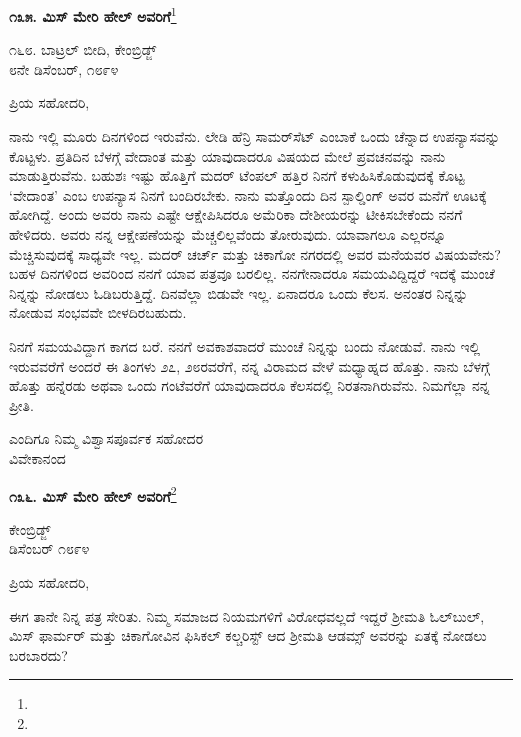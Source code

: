\begin{center}
\textbf{೧೩೫. ಮಿಸ್ ಮೇರಿ ಹೇಲ್ ಅವರಿಗೆ}\footnote{}
\end{center}

\begin{flushright}
೧೬೮. ಬಾಟ್ರಲ್ ಬೀದಿ, ಕೇಂಬ್ರಿಡ್ಜ್\\೮ನೇ ಡಿಸೆಂಬರ್, ೧೮೯೪
\end{flushright}

\noindent
ಪ್ರಿಯ ಸಹೋದರಿ,

ನಾನು ಇಲ್ಲಿ ಮೂರು ದಿನಗಳಿಂದ ಇರುವೆನು. ಲೇಡಿ ಹೆನ್ರಿ ಸಾಮರ್‌ಸೆಟ್\enginline{-} ಎಂಬಾಕೆ ಒಂದು ಚೆನ್ನಾದ ಉಪನ್ಯಾಸವನ್ನು ಕೊಟ್ಟಳು. ಪ್ರತಿದಿನ ಬೆಳಗ್ಗೆ ವೇದಾಂತ ಮತ್ತು ಯಾವುದಾದರೂ ವಿಷಯದ ಮೇಲೆ ಪ್ರವಚನವನ್ನು ನಾನು ಮಾಡುತ್ತಿರುವೆನು. ಬಹುಶಃ ಇಷ್ಟು ಹೊತ್ತಿಗೆ ಮದರ್ ಟೆಂಪಲ್ ಹತ್ತಿರ ನಿನಗೆ ಕಳುಹಿಸಿಕೊಡುವುದಕ್ಕೆ ಕೊಟ್ಟ `ವೇದಾಂತ' ಎಂಬ ಉಪನ್ಯಾಸ ನಿನಗೆ ಬಂದಿರಬೇಕು. ನಾನು ಮತ್ತೊಂದು ದಿನ ಸ್ಪಾಲ್ಡಿಂಗ್ ಅವರ ಮನೆಗೆ ಊಟಕ್ಕೆ ಹೋಗಿದ್ದೆ. ಅಂದು ಅವರು ನಾನು ಎಷ್ಟೇ ಆಕ್ಷೇಪಿಸಿದರೂ ಅಮೆರಿಕಾ ದೇಶೀಯರನ್ನು ಟೀಕಿಸಬೇಕೆಂದು ನನಗೆ ಹೇಳಿದರು. ಅವರು ನನ್ನ ಆಕ್ಷೇಪಣೆಯನ್ನು ಮೆಚ್ಚಲಿಲ್ಲವೆಂದು ತೋರುವುದು. ಯಾವಾಗಲೂ ಎಲ್ಲರನ್ನೂ ಮೆಚ್ಚಿಸುವುದಕ್ಕೆ ಸಾಧ್ಯವೇ ಇಲ್ಲ. ಮದರ್ ಚರ್ಚ್ ಮತ್ತು ಚಿಕಾಗೋ ನಗರದಲ್ಲಿ ಅವರ ಮನೆಯವರ ವಿಷಯವೇನು? ಬಹಳ ದಿನಗಳಿಂದ ಅವರಿಂದ ನನಗೆ ಯಾವ ಪತ್ರವೂ ಬರಲಿಲ್ಲ. ನನಗೇನಾದರೂ ಸಮಯವಿದ್ದಿದ್ದರೆ ಇದಕ್ಕೆ ಮುಂಚೆ ನಿನ್ನನ್ನು ನೋಡಲು ಓಡಿಬರುತ್ತಿದ್ದೆ. ದಿನವೆಲ್ಲಾ ಬಿಡುವೇ ಇಲ್ಲ. ಏನಾದರೂ ಒಂದು ಕೆಲಸ. ಅನಂತರ ನಿನ್ನನ್ನು ನೋಡುವ ಸಂಭವವೇ ಬೀಳದಿರಬಹುದು.

ನಿನಗೆ ಸಮಯವಿದ್ದಾಗ ಕಾಗದ ಬರೆ. ನನಗೆ ಅವಕಾಶವಾದರೆ ಮುಂಚೆ ನಿನ್ನನ್ನು ಬಂದು ನೋಡುವೆ. ನಾನು ಇಲ್ಲಿ ಇರುವವರೆಗೆ ಅಂದರೆ ಈ ತಿಂಗಳು ೨೭, ೨೮ರವರೆಗೆ, ನನ್ನ ವಿರಾಮದ ವೇಳೆ ಮಧ್ಯಾಹ್ನದ ಹೊತ್ತು. ನಾನು ಬೆಳಗ್ಗೆ ಹೊತ್ತು ಹನ್ನೆರಡು ಅಥವಾ ಒಂದು ಗಂಟೆವರೆಗೆ ಯಾವುದಾದರೂ ಕೆಲಸದಲ್ಲಿ ನಿರತನಾಗಿರುವೆನು. ನಿಮಗೆಲ್ಲಾ ನನ್ನ ಪ್ರೀತಿ.

{\flushright
ಎಂದಿಗೂ ನಿಮ್ಮ ವಿಶ್ವಾಸಪೂರ್ವಕ ಸಹೋದರ\\ವಿವೇಕಾನಂದ\par}

\begin{center}
\textbf{೧೩೬. ಮಿಸ್ ಮೇರಿ ಹೇಲ್‌ ಅವರಿಗೆ}\footnote{}
\end{center}

\vspace{-0.7cm}

\begin{flushright}
ಕೇಂಬ್ರಿಡ್ಜ್\\ಡಿಸೆಂಬರ್ ೧೮೯೪
\end{flushright}

\vspace{-0.6cm}

\noindent
ಪ್ರಿಯ ಸಹೋದರಿ,

ಈಗ ತಾನೇ ನಿನ್ನ ಪತ್ರ ಸೇರಿತು. ನಿಮ್ಮ ಸಮಾಜದ ನಿಯಮಗಳಿಗೆ ವಿರೋಧವಲ್ಲದೆ ಇದ್ದರೆ ಶ‍್ರೀಮತಿ ಓಲ್‌ಬುಲ್, ಮಿಸ್ ಫಾರ್ಮರ್ ಮತ್ತು ಚಿಕಾಗೋವಿನ ಫಿಸಿಕಲ್ ಕಲ್ಚರಿಸ್ಟ್ ಆದ ಶ‍್ರೀಮತಿ ಆಡಮ್ಸ್ ಅವರನ್ನು ಏತಕ್ಕೆ ನೋಡಲು ಬರಬಾರದು?

